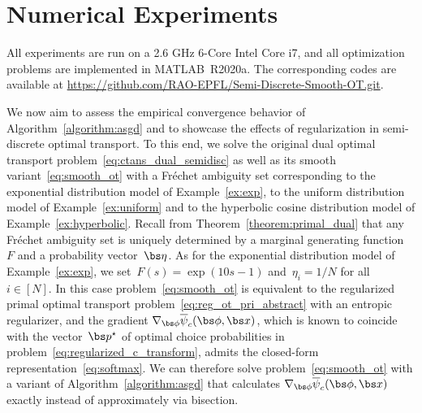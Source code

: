 \documentclass[11pt, a4paper, oneside, reqno]{article}
\begin{document}
	\section{Numerical Experiments}
	\label{sec:numerical}
    All experiments are run on a 2.6 GHz 6-Core Intel Core i7, and all optimization problems are implemented in MATLAB~R2020a. The corresponding codes are available at \url{https://github.com/RAO-EPFL/Semi-Discrete-Smooth-OT.git}.
 
     We now aim to assess the empirical convergence behavior of Algorithm~\ref{algorithm:asgd} and to showcase the effects of regularization in semi-discrete optimal transport. To this end, we solve the original dual optimal transport problem~\eqref{eq:ctans_dual_semidisc} as well as its smooth variant~\eqref{eq:smooth_ot} with a Fr\'echet ambiguity set corresponding to the exponential distribution model of Example~\ref{ex:exp}, to the uniform distribution model of Example~\ref{ex:uniform} {\color{black} and to the hyperbolic cosine distribution model of Example~\ref{ex:hyperbolic}}. %
     Recall from Theorem~\ref{theorem:primal_dual} that any Fr\'echet ambiguity set is uniquely determined by a marginal generating function~$F$ and a probability vector~$\bs \eta$. As for the exponential distribution model of Example~\ref{ex:exp}, we set~$F(s) = \exp(10 s - 1)$ and~$\eta_i = 1/N$ for all~$i\in[N]$. In this case problem~\eqref{eq:smooth_ot} is equivalent to the regularized primal optimal transport problem~\eqref{eq:reg_ot_pri_abstract} with an entropic regularizer, and the gradient $\nabla_{\bs \phi}\overline \psi_c(\bs \phi, \bs x)$, which is known to coincide with the vector~$\bs p^\star$ of optimal choice probabilities in problem~\eqref{eq:regularized_c_transform}, admits the closed-form representation~\eqref{eq:softmax}. We can therefore solve problem~\eqref{eq:smooth_ot} with a variant of Algorithm~\ref{algorithm:asgd} that calculates $\nabla_{\bs \phi}\overline \psi_c(\bs \phi, \bs x)$ exactly instead of approximately via bisection. %
\end{document}
